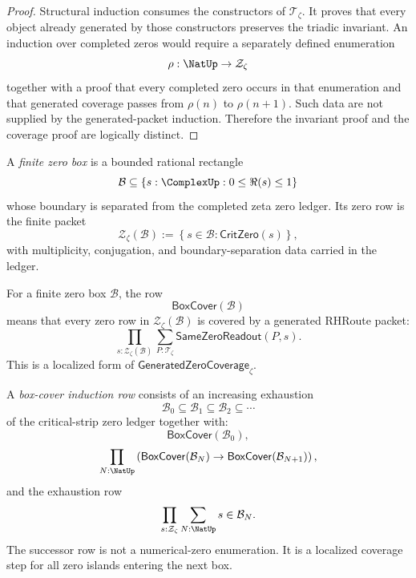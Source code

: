 \begin{proof}
Structural induction consumes the constructors of $\mathcal T_{\zeta}$.
It proves that every object already generated by those constructors
preserves the triadic invariant.  An induction over completed zeros
would require a separately defined enumeration
$$
\rho:\NatUp\to\mathcal Z_{\zeta}
$$
together with a proof that every completed zero occurs in that
enumeration and that generated coverage passes from $\rho(n)$ to
$\rho(n+1)$.  Such data are not supplied by the generated-packet
induction.  Therefore the invariant proof and the coverage proof are
logically distinct.
\end{proof}

\begin{definition}
\label{def:unified-reality-finite-zero-box}
A \emph{finite zero box} is a bounded rational rectangle
$$
\mathcal B\subseteq
\left\{s:\ComplexUp:0\le\Re(s)\le1\right\}
$$
whose boundary is separated from the completed zeta zero ledger.  Its
zero row is the finite packet
$$
\mathcal Z_{\zeta}(\mathcal B)
:=
\left\{
s\in\mathcal B:
\mathsf{CritZero}(s)
\right\},
$$
with multiplicity, conjugation, and boundary-separation data carried in
the ledger.
\end{definition}

\begin{definition}
\label{def:unified-reality-box-cover}
For a finite zero box $\mathcal B$, the row
$$
\mathsf{BoxCover}(\mathcal B)
$$
means that every zero row in $\mathcal Z_{\zeta}(\mathcal B)$ is covered
by a generated RHRoute packet:
$$
\prod_{s:\mathcal Z_{\zeta}(\mathcal B)}
\sum_{P:\mathcal T_{\zeta}}
\mathsf{SameZeroReadout}(P,s).
$$
This is a localized form of
$\mathsf{GeneratedZeroCoverage}_{\zeta}$.
\end{definition}

\begin{definition}
\label{def:unified-reality-box-cover-induction-row}
A \emph{box-cover induction row} consists of an increasing exhaustion
$$
\mathcal B_0\subseteq\mathcal B_1\subseteq\mathcal B_2\subseteq\cdots
$$
of the critical-strip zero ledger together with:
$$
\mathsf{BoxCover}(\mathcal B_0),
$$
$$
\prod_{N:\NatUp}
\left(
\mathsf{BoxCover}(\mathcal B_N)
\to
\mathsf{BoxCover}(\mathcal B_{N+1})
\right),
$$
and the exhaustion row
$$
\prod_{s:\mathcal Z_{\zeta}}
\sum_{N:\NatUp}
s\in\mathcal B_N.
$$
The successor row is not a numerical-zero enumeration.  It is a
localized coverage step for all zero islands entering the next box.
\end{definition}

